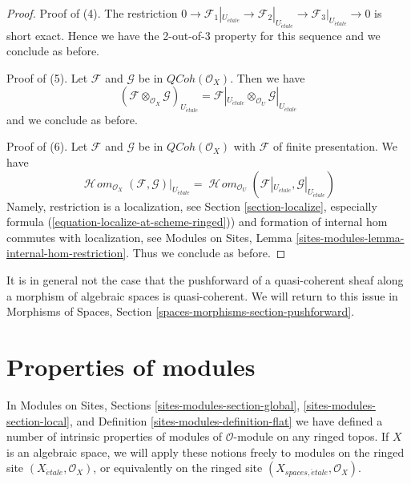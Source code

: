 \documentclass{stacks-project}
\theoremstyle{plain}
\theoremstyle{definition}
\theoremstyle{remark}
\numberwithin{equation}{subsection}
\def\SheafHom{\mathop{\mathcal{H}\!\mathit{om}}\nolimits}
\def\etale{{\acute{e}tale}}
\def\QCoh{\mathit{QCoh}}
\begin{document}
\begin{proof}
\medskip\noindent
Proof of (4). The restriction
$0 \to \mathcal{F}_1|_{U_\etale} \to \mathcal{F}_2|_{U_\etale}
\to \mathcal{F}_3|_{U_\etale} \to 0$
is short exact. Hence we have the 2-out-of-3 property
for this sequence and we conclude as before.

\medskip\noindent
Proof of (5). Let $\mathcal{F}$ and $\mathcal{G}$ be in $\QCoh(\mathcal{O}_X)$.
Then we have
$$
(\mathcal{F} \otimes_{\mathcal{O}_X} \mathcal{G})_{U_\etale} =
\mathcal{F}|_{U_\etale} \otimes_{\mathcal{O}_U} \mathcal{G}|_{U_\etale}
$$
and we conclude as before.

\medskip\noindent
Proof of (6). Let $\mathcal{F}$ and $\mathcal{G}$
be in $\QCoh(\mathcal{O}_X)$ with $\mathcal{F}$
of finite presentation. We have
$$
\SheafHom_{\mathcal{O}_X}(\mathcal{F}, \mathcal{G})|_{U_\etale} =
\SheafHom_{\mathcal{O}_U}(\mathcal{F}|_{U_\etale}, \mathcal{G}|_{U_\etale})
$$
Namely, restriction is a localization, see
Section \ref{section-localize}, especially formula
(\ref{equation-localize-at-scheme-ringed})) and formation of internal
hom commutes with localization, see
Modules on Sites, Lemma \ref{sites-modules-lemma-internal-hom-restriction}.
Thus we conclude as before.
\end{proof}

\noindent
It is in general not the case that the pushforward of a quasi-coherent sheaf
along a morphism of algebraic spaces is quasi-coherent. We will return to this
issue in
Morphisms of Spaces, Section \ref{spaces-morphisms-section-pushforward}.




\section{Properties of modules}
\label{section-properties-modules}

\noindent
In
Modules on Sites, Sections
\ref{sites-modules-section-global},
\ref{sites-modules-section-local}, and
Definition \ref{sites-modules-definition-flat}
we have defined a number of intrinsic properties of modules of
$\mathcal{O}$-module on any ringed topos. If $X$ is an algebraic
space, we will apply these notions freely to modules on the ringed
site $(X_\etale, \mathcal{O}_X)$, or equivalently on the ringed site
$(X_{spaces, \etale}, \mathcal{O}_X)$.
\end{document}
